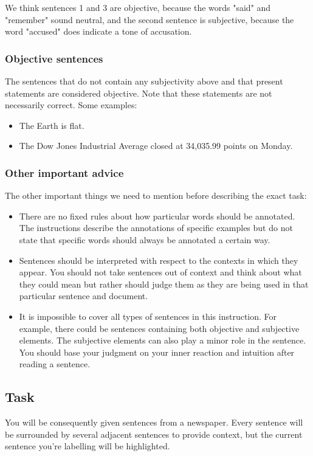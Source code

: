 \documentclass[conference]{IEEEtran}
\begin{document}
We think sentences 1 and 3 are objective, because the words "said" and "remember" sound neutral, and the second sentence is subjective, because the word "accused" does indicate a tone of accusation.

\subsubsection*{Objective sentences}
The sentences that do not contain any subjectivity above and that present statements are considered objective. Note that these statements are not necessarily correct. Some examples:
\begin{itemize}
    \item The Earth is flat.
    \item The Dow Jones Industrial Average closed at 34,035.99 points on Monday.
\end{itemize}
\subsubsection*{Other important advice}
The other important things we need to mention before describing the exact task:
\begin{itemize}
    \item There are no fixed rules about how particular words should be annotated. The instructions describe the annotations of specific examples but do not state that specific words should always be annotated a certain way.
    \item Sentences should be interpreted with respect to the contexts in which they appear. You should not take sentences out of context and think about what they could mean but rather should judge them as they are being used in that particular sentence and document.
    \item It is impossible to cover all types of sentences in this instruction. For example, there could be sentences containing both objective and subjective elements. The subjective elements can also play a minor role in the sentence. You should base your judgment on your inner reaction and intuition after reading a sentence.
\end{itemize}
\subsection*{Task}
You will be consequently given sentences from a newspaper. Every sentence will be surrounded by several adjacent sentences to provide context, but the current sentence you're labelling will be highlighted.
\end{document}
